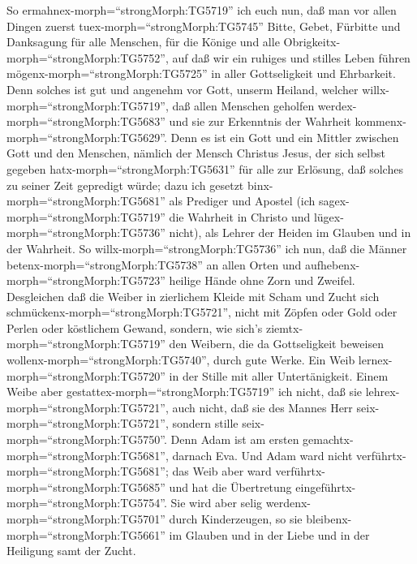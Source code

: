  So ermahnex-morph=``strongMorph:TG5719'' ich euch nun, daß
man vor allen Dingen zuerst tuex-morph=``strongMorph:TG5745'' Bitte,
Gebet, Fürbitte und Danksagung für alle Menschen,  für die
Könige und alle Obrigkeitx-morph=``strongMorph:TG5752'', auf daß wir ein
ruhiges und stilles Leben führen mögenx-morph=``strongMorph:TG5725'' in
aller Gottseligkeit und Ehrbarkeit.  Denn solches ist gut
und angenehm vor Gott, unserm Heiland,  welcher
willx-morph=``strongMorph:TG5719'', daß allen Menschen geholfen
werdex-morph=``strongMorph:TG5683'' und sie zur Erkenntnis der Wahrheit
kommenx-morph=``strongMorph:TG5629''.  Denn es ist ein Gott
und ein Mittler zwischen Gott und den Menschen, nämlich der Mensch
Christus Jesus,  der sich selbst gegeben
hatx-morph=``strongMorph:TG5631'' für alle zur Erlösung, daß solches zu
seiner Zeit gepredigt würde;  dazu ich gesetzt
binx-morph=``strongMorph:TG5681'' als Prediger und Apostel (ich
sagex-morph=``strongMorph:TG5719'' die Wahrheit in Christo und
lügex-morph=``strongMorph:TG5736'' nicht), als Lehrer der Heiden im
Glauben und in der Wahrheit.  So
willx-morph=``strongMorph:TG5736'' ich nun, daß die Männer
betenx-morph=``strongMorph:TG5738'' an allen Orten und
aufhebenx-morph=``strongMorph:TG5723'' heilige Hände ohne Zorn und
Zweifel.  Desgleichen daß die Weiber in zierlichem Kleide
mit Scham und Zucht sich schmückenx-morph=``strongMorph:TG5721'', nicht
mit Zöpfen oder Gold oder Perlen oder köstlichem Gewand, 
sondern, wie sich's ziemtx-morph=``strongMorph:TG5719'' den Weibern, die
da Gottseligkeit beweisen wollenx-morph=``strongMorph:TG5740'', durch
gute Werke.  Ein Weib lernex-morph=``strongMorph:TG5720''
in der Stille mit aller Untertänigkeit.  Einem Weibe aber
gestattex-morph=``strongMorph:TG5719'' ich nicht, daß sie
lehrex-morph=``strongMorph:TG5721'', auch nicht, daß sie des Mannes Herr
seix-morph=``strongMorph:TG5721'', sondern stille
seix-morph=``strongMorph:TG5750''.  Denn Adam ist am ersten
gemachtx-morph=``strongMorph:TG5681'', darnach Eva.  Und
Adam ward nicht verführtx-morph=``strongMorph:TG5681''; das Weib aber
ward verführtx-morph=``strongMorph:TG5685'' und hat die Übertretung
eingeführtx-morph=``strongMorph:TG5754''.  Sie wird aber
selig werdenx-morph=``strongMorph:TG5701'' durch Kinderzeugen, so sie
bleibenx-morph=``strongMorph:TG5661'' im Glauben und in der Liebe und in
der Heiligung samt der Zucht.

